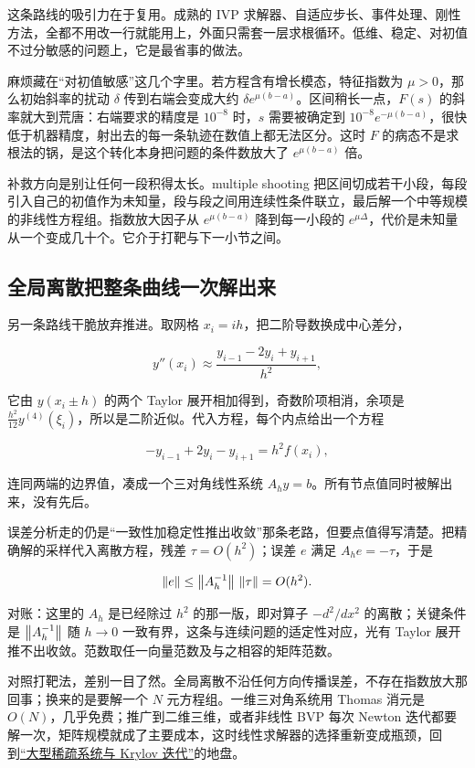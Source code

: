 这条路线的吸引力在于复用。成熟的 IVP 求解器、自适应步长、事件处理、刚性方法，全都不用改一行就能用上，外面只需套一层求根循环。低维、稳定、对初值不过分敏感的问题上，它是最省事的做法。

麻烦藏在``对初值敏感''这几个字里。若方程含有增长模态，特征指数为 \(\mu>0\)，那么初始斜率的扰动 \(\delta\) 传到右端会变成大约 \(\delta e^{\mu(b-a)}\)。区间稍长一点，\(F(s)\) 的斜率就大到荒唐：右端要求的精度是 \(10^{-8}\) 时，\(s\) 需要被确定到 \(10^{-8}e^{-\mu(b-a)}\)，很快低于机器精度，射出去的每一条轨迹在数值上都无法区分。这时 \(F\) 的病态不是求根法的锅，是这个转化本身把问题的条件数放大了 \(e^{\mu(b-a)}\) 倍。

补救方向是别让任何一段积得太长。multiple shooting 把区间切成若干小段，每段引入自己的初值作为未知量，段与段之间用连续性条件联立，最后解一个中等规模的非线性方程组。指数放大因子从 \(e^{\mu(b-a)}\) 降到每一小段的 \(e^{\mu\Delta}\)，代价是未知量从一个变成几十个。它介于打靶与下一小节之间。

\subsection{全局离散把整条曲线一次解出来}

另一条路线干脆放弃推进。取网格 \(x_i=ih\)，把二阶导数换成中心差分，

\[
y''(x_i)\approx\frac{y_{i-1}-2y_i+y_{i+1}}{h^{2}},
\]

它由 \(y(x_i\pm h)\) 的两个 Taylor 展开相加得到，奇数阶项相消，余项是 \(\frac{h^{2}}{12}y^{(4)}(\xi_i)\)，所以是二阶近似。代入方程，每个内点给出一个方程

\[
-y_{i-1}+2y_i-y_{i+1}=h^{2}f(x_i),
\]

连同两端的边界值，凑成一个三对角线性系统 \(A_h y=b\)。所有节点值同时被解出来，没有先后。

误差分析走的仍是``一致性加稳定性推出收敛''那条老路，但要点值得写清楚。把精确解的采样代入离散方程，残差 \(\tau=O(h^{2})\)；误差 \(e\) 满足 \(A_h e=-\tau\)，于是

\[
\left\lVert e\right\rVert\le\left\lVert A_h^{-1}\right\rVert\,\left\lVert\tau\right\rVert=O(h^{2}).
\]

对账：这里的 \(A_h\) 是已经除过 \(h^{2}\) 的那一版，即对算子 \(-d^2/dx^2\) 的离散；关键条件是 \(\left\lVert A_h^{-1}\right\rVert\) 随 \(h\to0\) 一致有界，这条与连续问题的适定性对应，光有 Taylor 展开推不出收敛。范数取任一向量范数及与之相容的矩阵范数。

对照打靶法，差别一目了然。全局离散不沿任何方向传播误差，不存在指数放大那回事；换来的是要解一个 \(N\) 元方程组。一维三对角系统用 Thomas 消元是 \(O(N)\)，几乎免费；推广到二维三维，或者非线性 BVP 每次 Newton 迭代都要解一次，矩阵规模就成了主要成本，这时线性求解器的选择重新变成瓶颈，回到\hyperref[sec:08-Numerical-Analysis/05-Numerical-Linear-Algebra/04]{``大型稀疏系统与 Krylov 迭代''}的地盘。

